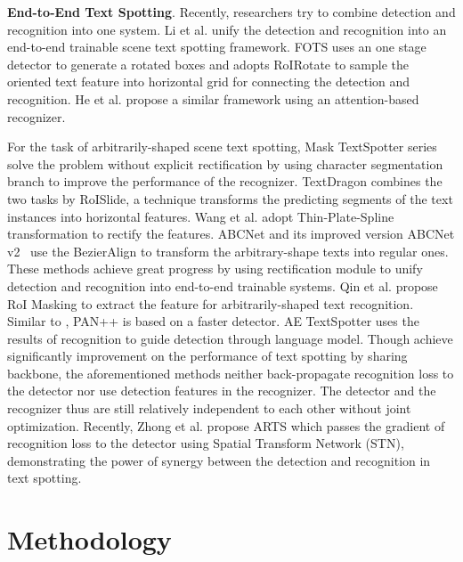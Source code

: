 \documentclass[10pt,twocolumn,letterpaper]{article}
\begin{document}
\textbf{End-to-End Text Spotting}.
Recently, researchers try to combine detection and recognition into one system. Li et al. \cite{li2017towards} unify the detection and recognition into an end-to-end trainable scene text spotting framework.
FOTS \cite{liu2018fots} uses an one stage detector to generate a rotated boxes and adopts RoIRotate to sample the oriented text feature into horizontal grid for connecting the detection and recognition. He et al. \cite{he2018end} propose a similar framework using an attention-based recognizer.

For the task of arbitrarily-shaped scene text spotting, 
Mask TextSpotter series \cite{lyu2018mask,liao2019mask,liao2020mask} solve the problem without explicit rectification by using character segmentation branch to improve the performance of the recognizer.
TextDragon \cite{feng2019textdragon} combines the two tasks by RoISlide, a technique transforms the predicting segments of the text instances into horizontal features. Wang et al. \cite{wang2020all} adopt Thin-Plate-Spline\cite{bookstein1989principal} transformation to rectify the features. ABCNet \cite{liu2020abcnet} and its improved version ABCNet v2~\cite{liu2021abcnetv2} use the BezierAlign to transform the arbitrary-shape texts into regular ones. These methods achieve great progress by using rectification module to unify detection and recognition into end-to-end trainable systems. 
Qin et al.\cite{qin2019towards} propose RoI Masking to extract the feature for arbitrarily-shaped text recognition. Similar to \cite{qin2019towards}, PAN++\cite{wang2021pan++} is based on a faster detector\cite{wang2019efficient}. AE TextSpotter\cite{wang2020ae} uses the results of recognition to guide detection through language model. Though achieve significantly improvement on the performance of text spotting by sharing backbone, the aforementioned methods neither back-propagate recognition loss to the detector nor use detection features in the recognizer. The detector and the recognizer thus are still relatively independent to each other without joint optimization.
Recently, Zhong et al. \cite{zhong2021arts} propose ARTS which passes the gradient of recognition loss to the detector using Spatial Transform Network (STN)\cite{2015Spatial}, demonstrating the power of synergy between the detection and recognition in text spotting.



\section{Methodology}
\label{sec:method}
\end{document}
